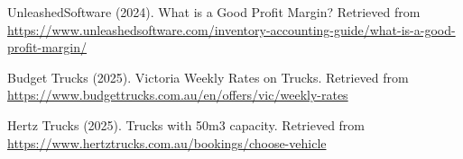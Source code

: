 \documentclass[a4paper,12pt]{article}
\begin{document}
\begin{thebibliography}{99}
    UnleashedSoftware (2024).
    What is a Good Profit Margin?
    Retrieved from \url{https://www.unleashedsoftware.com/inventory-accounting-guide/what-is-a-good-profit-margin/}

    Budget Trucks (2025).
    Victoria Weekly Rates on Trucks.
    Retrieved from \url{https://www.budgettrucks.com.au/en/offers/vic/weekly-rates}

    Hertz Trucks (2025).
    Trucks with 50m3 capacity.
    Retrieved from \url{https://www.hertztrucks.com.au/bookings/choose-vehicle}


\end{thebibliography}
\end{document}
